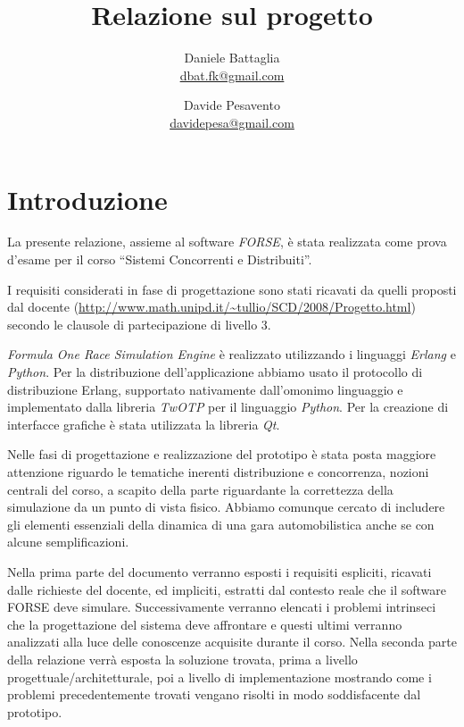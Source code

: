 \documentclass[11pt,a4paper]{report}
\title{Relazione sul progetto}
\author{Daniele Battaglia\\\url{dbat.fk@gmail.com}
	\and Davide Pesavento\\\url{davidepesa@gmail.com}}
\date{}
\begin{document}
\maketitle

\tableofcontents

\clearpage

\chapter{Introduzione}
La presente relazione, assieme al software \textsl{FORSE}, è stata realizzata come prova d'esame per il corso ``Sistemi Concorrenti e Distribuiti''.

I requisiti considerati in fase di progettazione sono stati ricavati da quelli proposti dal docente (\url{http://www.math.unipd.it/~tullio/SCD/2008/Progetto.html})
secondo le clausole di partecipazione di livello 3.

\textsl{Formula One Race Simulation Engine} è realizzato utilizzando i linguaggi \textsl{Erlang} e \textsl{Python}. Per la distribuzione dell'applicazione abbiamo
usato il protocollo di distribuzione Erlang, supportato nativamente dall'omonimo linguaggio e implementato dalla libreria \textsl{TwOTP} per il linguaggio
\textsl{Python}.
Per la creazione di interfacce grafiche è stata utilizzata la libreria \textsl{Qt}.

Nelle fasi di progettazione e realizzazione del prototipo è stata posta maggiore attenzione riguardo le tematiche inerenti distribuzione e concorrenza, nozioni
centrali del corso, a scapito della parte riguardante la correttezza della simulazione da un punto di vista fisico. Abbiamo comunque cercato di includere
gli elementi essenziali della dinamica di una gara automobilistica anche se con alcune semplificazioni.

Nella prima parte del documento verranno esposti i requisiti espliciti, ricavati dalle richieste del docente, ed impliciti, estratti dal contesto reale che il software FORSE deve simulare.
Successivamente verranno elencati i problemi intrinseci che la progettazione del sistema deve affrontare e questi ultimi verranno analizzati alla luce delle conoscenze acquisite durante il corso.
Nella seconda parte della relazione verrà esposta la soluzione trovata, prima a livello progettuale/architetturale, poi a livello di implementazione mostrando come i problemi precedentemente trovati vengano risolti in modo soddisfacente dal prototipo.
\end{document}
